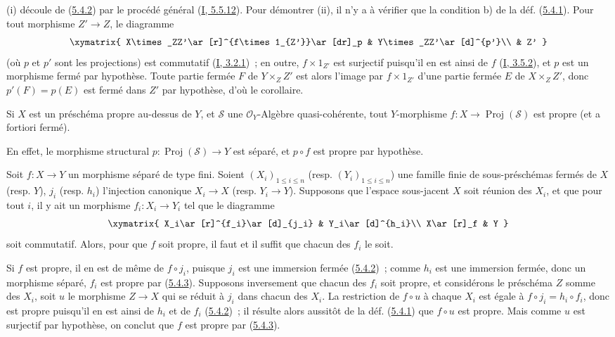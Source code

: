 (i) découle de (\hyperref[II.5.4.2-fr]{5.4.2}) par le procédé général
(\hyperref[I.5.5.12-fr]{I, 5.5.12}). Pour démontrer (ii), il n'y a à
vérifier que la condition b) de la déf. (\hyperref[II.5.4.1-fr]{5.4.1}).
Pour tout morphisme $Z'\to Z$, le diagramme
\[
  \xymatrix{
    X\times_ZZ'\ar[r]^{f\times1_{Z'}}\ar[dr]_p &
    Y\times_ZZ'\ar[d]^{p'}\\
    & Z'
  }
\]
(où $p$ et $p'$ sont les projections) est commutatif
(\hyperref[I.3.2.1-fr]{I, 3.2.1})~; en outre, $f\times1_{Z'}$ est surjectif
puisqu'il en est ainsi de $f$ (\hyperref[I.3.5.2-fr]{I, 3.5.2}), et $p$ est
un morphisme fermé par hypothèse. Toute partie fermée $F$ de
$Y\times_ZZ'$ est alors l'image par $f\times1_{Z'}$ d'une partie fermée $E$
de $X\times_ZZ'$, donc $p'(F)=p(E)$ est fermé dans $Z'$ par hypothèse, d'où
le corollaire.

\begin{corollary}[5.4.4]
\label{II.5.4.4-fr}
Si $X$ est un préschéma propre au-dessus de $Y$, et $\mathcal{S}$ une
$\mathcal{O}_Y$-Algèbre quasi-cohérente, tout $Y$-morphisme
$f:X\to\operatorname{Proj}(\mathcal{S})$ est propre (et a fortiori fermé).
\end{corollary}

En effet, le morphisme structural
$p:\operatorname{Proj}(\mathcal{S})\to Y$ est séparé, et $p\circ f$ est
propre par hypothèse.

\begin{corollary}[5.4.5]
\label{II.5.4.5-fr}
Soit $f:X\to Y$ un morphisme séparé de type fini. Soient
$(X_i)_{1\leq i\leq n}$ (resp. $(Y_i)_{1\leq i\leq n}$) une famille finie
de sous-préschémas fermés de $X$ (resp. $Y$), $j_i$ (resp. $h_i$)
l'injection canonique $X_i\to X$ (resp. $Y_i\to Y$). Supposons que l'espace
sous-jacent $X$ soit réunion des $X_i$, et que pour tout $i$, il y ait un
morphisme $f_i:X_i\to Y_i$ tel que le diagramme
\[
  \xymatrix{
    X_i\ar[r]^{f_i}\ar[d]_{j_i} & Y_i\ar[d]^{h_i}\\
    X\ar[r]_f & Y
  }
\]
soit commutatif. Alors, pour que $f$ soit propre, il faut et il suffit que
chacun des $f_i$ le soit.
\end{corollary}


Si $f$ est propre, il en est de même de $f\circ j_i$, puisque $j_i$ est une
immersion fermée (\hyperref[II.5.4.2-fr]{5.4.2})~; comme $h_i$ est une
immersion fermée, donc un morphisme séparé, $f_i$ est propre par
(\hyperref[II.5.4.3-fr]{5.4.3}). Supposons inversement que chacun des $f_i$
soit propre, et considérons le préschéma $Z$ somme des $X_i$, soit $u$ le
morphisme $Z\to X$ qui se réduit à $j_i$ dans chacun des $X_i$. La
restriction de $f\circ u$ à chaque $X_i$ est égale à
$f\circ j_i=h_i\circ f_i$, donc est propre puisqu'il en est ainsi de $h_i$
et de $f_i$ (\hyperref[II.5.4.2-fr]{5.4.2})~; il résulte alors aussitôt de
la déf. (\hyperref[II.5.4.1-fr]{5.4.1}) que $f\circ u$ est propre. Mais
comme $u$ est surjectif par hypothèse, on conclut que $f$ est propre par
(\hyperref[II.5.4.3-fr]{5.4.3}).

